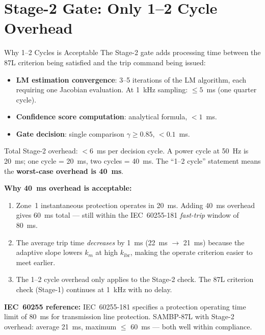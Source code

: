 \documentclass[12pt,a4paper]{article}
\newcommand{\kibr}{k_\mathrm{ibr}}
\begin{document}
\section{Stage-2 Gate: Only 1--2 Cycle Overhead}

\begin{archbox}{Why 1--2 Cycles is Acceptable}
The Stage-2 gate adds processing time between the 87L criterion being satisfied and the trip command being issued:
\begin{itemize}[nosep]
  \item \textbf{LM estimation convergence}: 3--5 iterations of the LM algorithm, each requiring one Jacobian evaluation. At 1~kHz sampling: $\leq 5$~ms (one quarter cycle).
  \item \textbf{Confidence score computation}: analytical formula, $< 1$~ms.
  \item \textbf{Gate decision}: single comparison $\gamma \geq 0.85$, $< 0.1$~ms.
\end{itemize}

Total Stage-2 overhead: $< 6$~ms per decision cycle. A power cycle at 50~Hz is 20~ms; one cycle = 20~ms, two cycles = 40~ms. The ``1--2 cycle'' statement means the \textbf{worst-case overhead is 40~ms}.

\textbf{Why 40~ms overhead is acceptable:}
\begin{enumerate}[nosep]
  \item Zone~1 instantaneous protection operates in 20~ms. Adding 40~ms overhead gives 60~ms total --- still within the IEC~60255-181 \emph{fast-trip} window of 80~ms.
  \item The average trip time \emph{decreases} by 1~ms (22~ms $\to$ 21~ms) because the adaptive slope lowers $k_m$ at high $\kibr$, making the operate criterion easier to meet earlier.
  \item The 1--2 cycle overhead only applies to the Stage-2 check. The 87L criterion check (Stage-1) continues at 1~kHz with no delay.
\end{enumerate}

\textbf{IEC~60255 reference:} IEC~60255-181 specifies a protection operating time limit of 80~ms for transmission line protection. SAMBP-87L with Stage-2 overhead: average 21~ms, maximum $\leq$ 60~ms --- both well within compliance.
\end{archbox}

\end{document}
